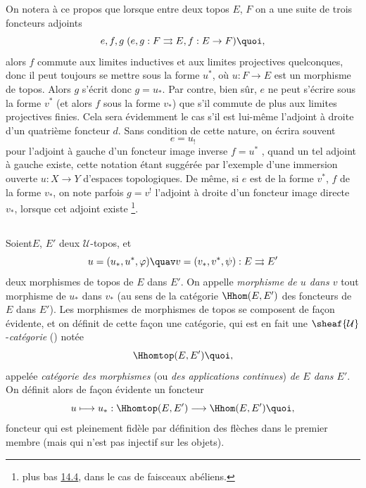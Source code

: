 \documentclass[10pt]{../fichiers-configuration-latex/smfart}
\begin{document}
On notera à ce propos que lorsque entre deux topos $E$, $F$ on a
une suite de trois foncteurs adjoints
$$
e, f, g\; (e,g: F\rightrightarrows E, f:E\rightarrow F){\quoi},
$$
alors $f$ commute aux limites inductives et aux limites projectives
quelconques, donc il peut toujours se mettre sous la forme
$u^{\ast}$, où $u:F\rightarrow E$ est un morphisme de topos. Alors
$g$ s'écrit donc $g=u_{\ast}$. Par contre, bien sûr, $e$ ne peut
s'écrire sous la forme $v^{\ast}$ (et alors $f$ sous la forme
$v_{\ast}$) que s'il commute de plus aux limites projectives finies.
Cela sera évidemment le cas s'il est lui-même l'adjoint à droite
d'un quatrième foncteur $d$. Sans condition de cette nature, on
écrira souvent
$$
e=u_{!}
$$
pour l'adjoint à gauche d'un foncteur image inverse $f=u^{\ast}$ ,
quand un tel adjoint à gauche existe, cette notation étant
suggérée par l'exemple d'une immersion ouverte $u:X\rightarrow
Y$ d'espaces topologiques. De même, si $e$ est de la forme
$v^{\ast}$, \ie $f$ de la forme $v_{\ast}$, on note parfois
$g=v^{!}$ l'adjoint à droite d'un foncteur image directe
$v_{\ast}$, lorsque cet adjoint existe \footnote[1]{\Cf plus bas \hyperref[IV.subsec14.4]{14.4},
dans le cas de faisceaux abéliens.}.

\subsection{}
Soient\pageoriginale $E$, $E'$ deux $𝒰$-topos, et
$$
u=(u_{\ast},u^{\ast},\varphi)\quav
v=(v_{\ast},v^{\ast},\psi):E\rightrightarrows E'
$$
deux morphismes de topos de $E$ dans $E'$. On appelle
\emph{morphisme de $u$ dans $v$} tout morphisme de $u_{\ast}$ dans
$v_{\ast}$ (au sens de la catégorie $\Hhom(E,E')$ des foncteurs de
$E$ dans $E'$). Les morphismes de morphismes de topos se composent
de façon évidente, et on définit de cette façon une catégorie,
qui est en fait une $\sheaf{\mathcal{U}}$-\emph{catégorie}
() notée
$$
\Hhomtop(E,E'){\quoi},
$$
appelée \emph{catégorie des morphismes} (ou \emph{des
applications continues}) \emph{de $E$ dans $E'$}. On définit alors
de façon évidente un foncteur
$$
u\longmapsto u_{\ast}:\Hhomtop(E,E')\longrightarrow
\Hhom(E,E'){\quoi},
$$
foncteur qui est pleinement fidèle par définition des flèches
dans le premier membre (mais qui n'est pas injectif sur les objets).
\end{document}
